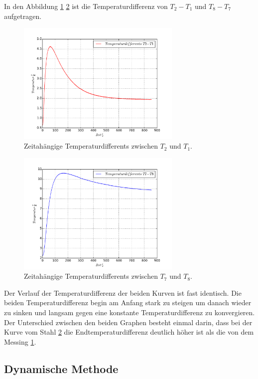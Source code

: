 In den Abbildung \ref{abb:T2-T1} \ref{abb:T7-T8} ist die
Temperaturdifferenz von $T_2-T_1$ und $T_8-T_7$ aufgetragen.
\begin{figure}
  \centering
  \includegraphics[width=0.7\textwidth]{plotT2-T1.pdf}
  \caption{Zeitahängige Temperaturdifferents zwischen $T_2$ und $T_1$.}
  \label{abb:T2-T1}
\end{figure}
\begin{figure}
  \centering
  \includegraphics[width=0.7\textwidth]{plotT7-T8.pdf}
  \caption{Zeitahängige Temperaturdifferents zwischen $T_7$ und $T_8$.}
  \label{abb:T7-T8}
\end{figure}
Der Verlauf der Temperaturdifferenz der beiden Kurven
ist fast identisch. Die beiden Temperaturdifferenz begin am
Anfang stark zu steigen um danach wieder zu sinken
und langsam gegen eine konstante Temperaturdifferenz
zu konvergieren.
Der Unterschied zwischen den beiden Graphen besteht einmal
darin, dass bei der Kurve vom Stahl \ref{abb:T7-T8} die Endtemperaturdifferenz
deutlich höher ist als die von dem Messing \ref{abb:T2-T1}.


\subsection{Dynamische Methode}

